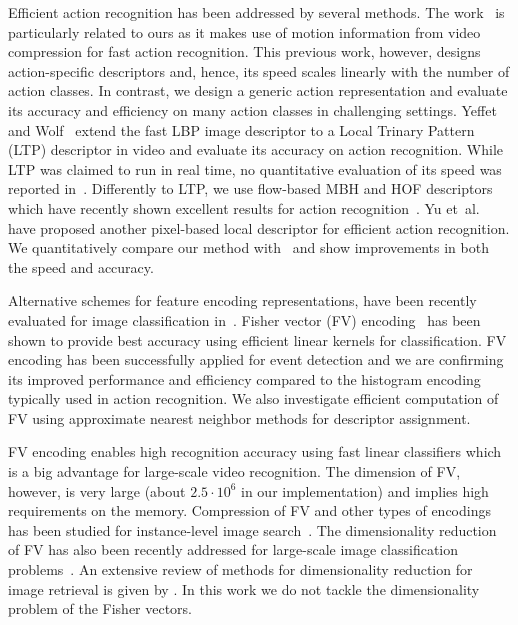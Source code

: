 \documentclass[10pt,twocolumn,letterpaper]{article}
\begin{document}
Efficient action recognition has been addressed by several
methods. The work~\cite{mpeg3,mpeg2,mpeg1} is particularly
related to ours as it makes use of motion information from video compression for fast action recognition. This previous work,
however, designs action-specific descriptors and, hence, its
speed scales linearly with the number of action classes. In
contrast, we design a generic action representation and evaluate its accuracy and efficiency on many action classes in
challenging settings.
Yeffet and Wolf~\cite{Yeffet09} extend the fast LBP image
descriptor to a Local Trinary Pattern (LTP) descriptor in video
and evaluate its accuracy on action recognition. While LTP was
claimed to run in real time, no quantitative evaluation of its
speed was reported in~\cite{Yeffet09}. Differently to LTP, we
use flow-based MBH and HOF descriptors which have recently shown excellent results for action recognition~\cite{Wang12}. Yu
et~al.~\cite{Yu10} have proposed another pixel-based local
descriptor for efficient action recognition. We quantitatively
compare our method with~\cite{Yu10} and show improvements in
both the speed and accuracy.

Alternative schemes for feature encoding
representations,
have been recently evaluated for image classification
in~\cite{Chatfield11}.
Fisher vector (FV) encoding~\cite{Perronnin10} has been shown to provide best accuracy using efficient linear kernels for
classification. FV encoding has been successfully applied for
event detection \cite{Revaud13} and we are confirming its
improved performance and efficiency compared to the
histogram encoding typically used in action recognition. We also investigate efficient computation of FV using approximate
nearest neighbor methods for descriptor assignment.

FV encoding enables high recognition accuracy using fast linear
classifiers which is a big advantage for large-scale video
recognition. The dimension of FV, however, is very large (about
$2.5\cdot10^6$ in our implementation) and implies high
requirements on the memory. Compression of FV and other types of encodings has been studied for instance-level image
search~\cite{Jegou12}. The dimensionality reduction of FV has
also been recently addressed for large-scale image
classification problems~\cite{Mensink12,Perronnin12,Sanchez13}.
An extensive review of methods for dimensionality reduction for
image retrieval is given by \cite{Grauman13}.
In this work we do not tackle the dimensionality problem of the
Fisher vectors.
\end{document}
